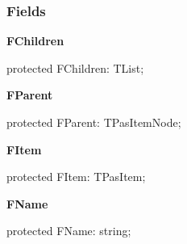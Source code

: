 \documentclass{report}
\newif\ifpdf
\begin{document}
\subsubsection*{\large{\textbf{Fields}}\normalsize\hspace{1ex}\hfill}
\begin{list}{}{
\setlength{\itemindent}{0cm}
\setlength{\listparindent}{0cm}
\setlength{\leftmargin}{\evensidemargin}
\addtolength{\leftmargin}{\tmplength}
\settowidth{\labelsep}{X}
\addtolength{\leftmargin}{\labelsep}
\setlength{\labelwidth}{\tmplength}
}
\label{PasDoc_HierarchyTree.TPasItemNode-FChildren}
\item[\textbf{FChildren}\hfill]
\ifpdf
\begin{flushleft}
\fi
\begin{ttfamily}
protected FChildren: TList;\end{ttfamily}

\ifpdf
\end{flushleft}
\fi


\par  \label{PasDoc_HierarchyTree.TPasItemNode-FParent}
\item[\textbf{FParent}\hfill]
\ifpdf
\begin{flushleft}
\fi
\begin{ttfamily}
protected FParent: TPasItemNode;\end{ttfamily}

\ifpdf
\end{flushleft}
\fi


\par  \label{PasDoc_HierarchyTree.TPasItemNode-FItem}
\item[\textbf{FItem}\hfill]
\ifpdf
\begin{flushleft}
\fi
\begin{ttfamily}
protected FItem: TPasItem;\end{ttfamily}

\ifpdf
\end{flushleft}
\fi


\par  \label{PasDoc_HierarchyTree.TPasItemNode-FName}
\item[\textbf{FName}\hfill]
\ifpdf
\begin{flushleft}
\fi
\begin{ttfamily}
protected FName: string;\end{ttfamily}

\ifpdf
\end{flushleft}
\fi


\par  \end{list}
\end{document}
